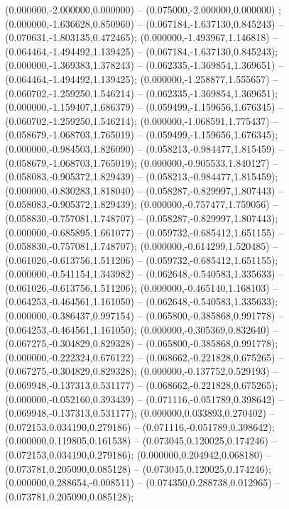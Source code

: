  (0.000000,-2.000000,0.000000) -- (0.075000,-2.000000,0.000000) ;
 (0.000000,-1.636628,0.850960) -- (0.067184,-1.637130,0.845243) -- (0.070631,-1.803135,0.472465);
 (0.000000,-1.493967,1.146818) -- (0.064464,-1.494492,1.139425) -- (0.067184,-1.637130,0.845243);
 (0.000000,-1.369383,1.378243) -- (0.062335,-1.369854,1.369651) -- (0.064464,-1.494492,1.139425);
 (0.000000,-1.258877,1.555657) -- (0.060702,-1.259250,1.546214) -- (0.062335,-1.369854,1.369651);
 (0.000000,-1.159407,1.686379) -- (0.059499,-1.159656,1.676345) -- (0.060702,-1.259250,1.546214);
 (0.000000,-1.068591,1.775437) -- (0.058679,-1.068703,1.765019) -- (0.059499,-1.159656,1.676345);
 (0.000000,-0.984503,1.826090) -- (0.058213,-0.984477,1.815459) -- (0.058679,-1.068703,1.765019);
 (0.000000,-0.905533,1.840127) -- (0.058083,-0.905372,1.829439) -- (0.058213,-0.984477,1.815459);
 (0.000000,-0.830283,1.818040) -- (0.058287,-0.829997,1.807443) -- (0.058083,-0.905372,1.829439);
 (0.000000,-0.757477,1.759056) -- (0.058830,-0.757081,1.748707) -- (0.058287,-0.829997,1.807443);
 (0.000000,-0.685895,1.661077) -- (0.059732,-0.685412,1.651155) -- (0.058830,-0.757081,1.748707);
 (0.000000,-0.614299,1.520485) -- (0.061026,-0.613756,1.511206) -- (0.059732,-0.685412,1.651155);
 (0.000000,-0.541154,1.343982) -- (0.062648,-0.540583,1.335633) -- (0.061026,-0.613756,1.511206);
 (0.000000,-0.465140,1.168103) -- (0.064253,-0.464561,1.161050) -- (0.062648,-0.540583,1.335633);
 (0.000000,-0.386437,0.997154) -- (0.065800,-0.385868,0.991778) -- (0.064253,-0.464561,1.161050);
 (0.000000,-0.305369,0.832640) -- (0.067275,-0.304829,0.829328) -- (0.065800,-0.385868,0.991778);
 (0.000000,-0.222324,0.676122) -- (0.068662,-0.221828,0.675265) -- (0.067275,-0.304829,0.829328);
 (0.000000,-0.137752,0.529193) -- (0.069948,-0.137313,0.531177) -- (0.068662,-0.221828,0.675265);
 (0.000000,-0.052160,0.393439) -- (0.071116,-0.051789,0.398642) -- (0.069948,-0.137313,0.531177);
 (0.000000,0.033893,0.270402) -- (0.072153,0.034190,0.279186) -- (0.071116,-0.051789,0.398642);
 (0.000000,0.119805,0.161538) -- (0.073045,0.120025,0.174246) -- (0.072153,0.034190,0.279186);
 (0.000000,0.204942,0.068180) -- (0.073781,0.205090,0.085128) -- (0.073045,0.120025,0.174246);
 (0.000000,0.288654,-0.008511) -- (0.074350,0.288738,0.012965) -- (0.073781,0.205090,0.085128);
